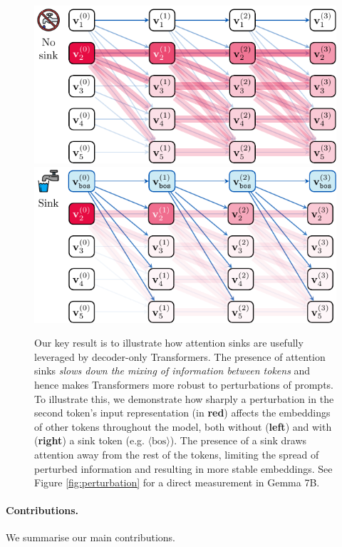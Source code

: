 \documentclass{article} %
\newcommand{\bos}{\ensuremath{\langle\text{bos}\rangle}\xspace}
\begin{document}
\begin{figure}
    \includegraphics[width=0.48\linewidth]{figures/tikz_osq_tx_nosink.pdf} \hfill 
    \includegraphics[width=0.48\linewidth]{figures/tikz_osq_tx_sink.pdf}
    \caption{Our key result is to illustrate how attention sinks are usefully leveraged by decoder-only Transformers. The presence of attention sinks \emph{slows down the mixing of information between tokens} and hence makes Transformers more robust to perturbations of prompts. To illustrate this, we demonstrate how sharply a perturbation in the second token's input representation (in \textcolor{mymauve}{\bf red}) affects the embeddings of other tokens throughout the model, both without ({\bf left}) and with ({\bf right}) a sink token (e.g. \bos). The presence of a sink draws attention away from the rest of the tokens, limiting the spread of perturbed information and resulting in more stable embeddings. See Figure \ref{fig:perturbation} for a direct measurement in Gemma 7B.}\label{fig:summary}
    \vspace{-15pt}
\end{figure}

\paragraph{Contributions.}

We summarise our main contributions.
\end{document}
